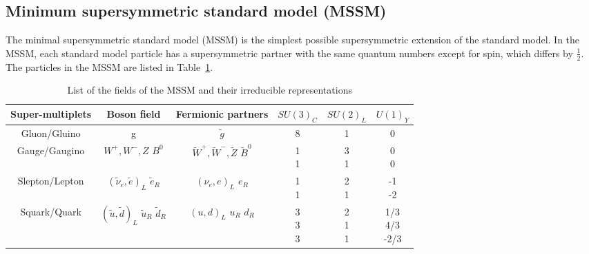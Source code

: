 \clearpage
\subsection{Minimum supersymmetric standard model (MSSM)}

The minimal supersymmetric standard model (MSSM) is the simplest possible supersymmetric extension of the standard model. In the MSSM, each standard model particle has a supersymmetric partner with the same quantum numbers except for spin, which differs by $\frac{1}{2}$. The particles in the MSSM are listed in Table~\ref{tab:c2mssmf}.

\begin{table}[htbp]
\fontsize{10 pt}{1.2 em}
\selectfont
\begin{centering}
\caption{\label{tab:c2mssmf}List of the fields of the MSSM and their irreducible representations}
\hspace*{-4ex}
\begin{tabular}{|c|c|c|c|c|c|}
\hline
Super-multiplets & Boson field & Fermionic partners & $SU(3)_{C}$ & $SU(2)_{L}$ & $U(1)_{Y}$ \\
\hline
Gluon/Gluino     & g & $\tilde{g}$ & 8 & 1 & 0 \\
\hline
Gauge/Gaugino    & \specialcell{$W^{+},W^{-},Z$ \\ $B^{0}$} & \specialcell{$\tilde{W}^{+},\tilde{W}^{-},\tilde{Z}$ \\ $\tilde{B}^{0}$} & \specialcell{1 \\ 1} & \specialcell{3 \\ 1} & \specialcell{0 \\ 0} \\
\hline
Slepton/Lepton   & \specialcell{$(\tilde{\nu}_{e},\tilde{e})_{L}$ \\ $\tilde{e}_{R}$} & \specialcell{$(\nu_{e},e)_{L}$ \\ $e_{R}$} & \specialcell{1 \\ 1} & \specialcell{2 \\ 1} & \specialcell{-1 \\ -2} \\
\hline
Squark/Quark     & \specialcell{$(\tilde{u},\tilde{d})_{L}$ \\ $\tilde{u}_{R}$ \\ $\tilde{d}_{R}$} & \specialcell{$(u,d)_{L}$ \\ $u_{R}$ \\ $d_{R}$} & \specialcell{3 \\ 3 \\ 3} & \specialcell{2 \\ 1 \\ 1} & \specialcell{1/3 \\ 4/3 \\ -2/3} \\

\end{tabular}
\end{centering}
\end{table}
